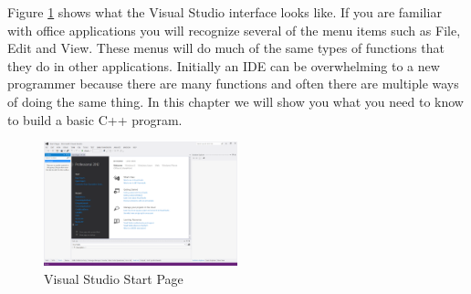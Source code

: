 Figure \ref{fig:visual-studio-start-page} shows what the Visual Studio interface looks like. If you are familiar with office applications you will recognize several of the menu items such as File, Edit and View.
These menus will do much of the same types of functions that they do in other applications. 
Initially an IDE can be overwhelming to a new programmer because there are many functions and often there are multiple ways of doing the same thing. 
In this chapter we will show you what you need to know to build a basic C++ program.
\begin{figure}
  \centering
  \includegraphics[width=0.5\textwidth]{diagrams/visual_studio_start_page.pdf}
  \caption{Visual Studio Start Page}\label{fig:visual-studio-start-page} 
\end{figure}

